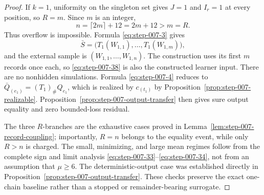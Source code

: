 \begin{proof}

If \(k=1\), uniformity on the singleton set gives \(J=1\) and
\(I_r=1\) at every position, so \(R=m\).  Since \(m\) is an integer,
\[
n=\lceil2m\rceil+12=2m+12>m=R.
\tag{37}\label{eq:step-007-37}
\]
Thus overflow is impossible.  Formula \eqref{eq:step-007-3} gives
\[
\bar S
=\bigl(T_1(W_{1,1}),\ldots,T_1(W_{1,m})\bigr),
\tag{38}\label{eq:step-007-38}
\]
and the external sample is
\((W_{1,1},\ldots,W_{1,n})\).  The construction uses its
first \(m\) records once each, so \eqref{eq:step-007-38} is also the constructed learner
input.  There are no nonhidden simulations.  Formula \eqref{eq:step-007-4} reduces to
\(\bar Q_{(e_1)}=(T_1)_\#Q_{e_1}\), which is realized by
\(c_{(t_1)}\) by Proposition~\ref{prop:step-007-realizable}.
Proposition~\ref{prop:step-007-output-transfer} then gives sure output
equality and zero bounded-loss residual.

The three \(R\)-branches are the exhaustive cases proved in
Lemma~\ref{lem:step-007-record-coupling}; importantly, \(R=n\) belongs
to the equality event, while only \(R>n\) is charged.  The small,
minimizing, and large mean regimes follow from the complete sign and
limit analysis \eqref{eq:step-007-33}--\eqref{eq:step-007-34}, not from an assumption that \(\mu\ge6\).
The deterministic-output case was established directly in
Proposition~\ref{prop:step-007-output-transfer}.  These checks preserve
the exact one-chain baseline rather than a stopped or
remainder-bearing surrogate.

\end{proof}

